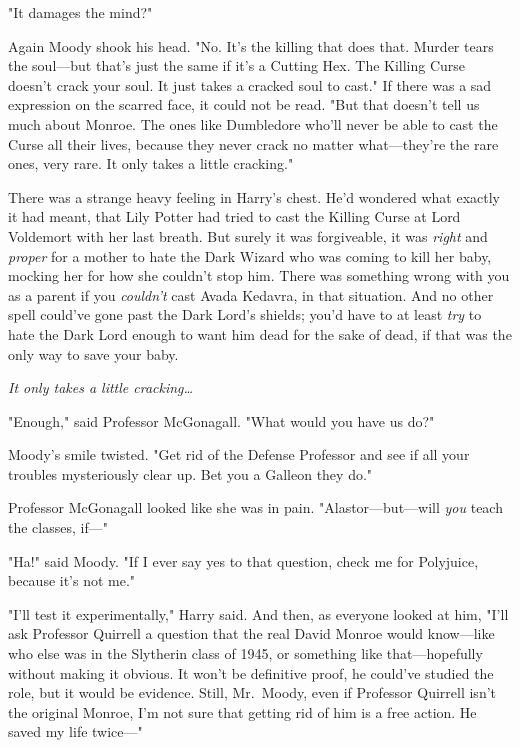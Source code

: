 "It damages the mind?"

Again Moody shook his head. "No. It's the killing that does that. Murder tears 
the soul---but that's just the same if it's a Cutting Hex. The Killing Curse 
doesn't crack your soul. It just takes a cracked soul to cast." If there was a 
sad expression on the scarred face, it could not be read. "But that doesn't 
tell us much about Monroe. The ones like Dumbledore who'll never be able to 
cast the Curse all their lives, because they never crack no matter 
what---they're the rare ones, very rare. It only takes a little cracking."

There was a strange heavy feeling in Harry's chest. He'd wondered what exactly 
it had meant, that Lily Potter had tried to cast the Killing Curse at Lord 
Voldemort with her last breath. But surely it was forgiveable, it was 
\emph{right} and \emph{proper} for a mother to hate the Dark Wizard who was 
coming to kill her baby, mocking her for how she couldn't stop him. There was 
something wrong with you as a parent if you \emph{couldn't} cast Avada Kedavra, 
in that situation. And no other spell could've gone past the Dark Lord's 
shields; you'd have to at least \emph{try} to hate the Dark Lord enough to want 
him dead for the sake of dead, if that was the only way to save your baby.

\emph{It only takes a little cracking{\ldots}}

"Enough," said Professor McGonagall. "What would you have us do?"

Moody's smile twisted. "Get rid of the Defense Professor and see if all your 
troubles mysteriously clear up. Bet you a Galleon they do."

Professor McGonagall looked like she was in pain. "Alastor---but---will 
\emph{you} teach the classes, if---"

"Ha!" said Moody. "If I ever say yes to that question, check me for Polyjuice, 
because it's not me."

"I'll test it experimentally," Harry said. And then, as everyone looked at him, 
"I'll ask Professor Quirrell a question that the real David Monroe would 
know---like who else was in the Slytherin class of 1945, or something like 
that---hopefully without making it obvious. It won't be definitive proof, he 
could've studied the role, but it would be evidence. Still, Mr.~Moody, even if 
Professor Quirrell isn't the original Monroe, I'm not sure that getting rid of 
him is a free action. He saved my life twice---"

